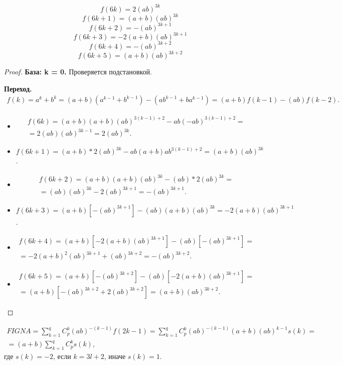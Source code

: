 {\theorem 
$$ f(6k)    = 2(ab)^{3k}        $$
$$ f(6k+1)  = (a+b)(ab)^{3k}    $$
$$ f(6k+2)  = -(ab)^{3k+1}      $$
$$ f(6k+3)  = -2(a+b)(ab)^{3k+1}$$
$$ f(6k+4)  = -(ab)^{3k+2}      $$
$$ f(6k+5)  = (a+b)(ab)^{3k+2}  $$
}
\begin{proof}

{\bfseries База: k = 0.}
Проверяется подстановкой.

{\bfseries Переход. }
\begin{multline*}
    f(k) = a^k + b^k = (a+b)(a^{k-1} + b^{k-1}) - (ab^{k-1} + ba^{k-1}) = (a+b)f(k-1) - (ab)f(k-2).
\end{multline*}
\begin{itemize}
    \item 
        \begin{multline*}
            f(6k) = (a+b)(a+b)(ab)^{3(k-1)+2} - ab(-ab)^{3(k-1)+2} = \\
            = 2(ab)(ab)^{3k-1} = 2(ab)^{3k}.
        \end{multline*}
    \item $f(6k+1) = (a+b) * 2(ab)^{3k} - ab(a+b)ab^{3(k-1)+2} = (a+b)(ab)^{3k}$.
    \item 
        \begin{multline*}
            f(6k+2) = (a+b)(a+b)(ab)^{3k} - (ab)*2(ab)^{3k} = \\
            = (ab)(ab)^{3k} - 2(ab)^{3k+1} = -(ab)^{3k+1}.
        \end{multline*}
    \item $f(6k+3) = (a+b)[-(ab)^{3k+1}] - (ab)(a+b)(ab)^{3k} = -2(a+b)(ab)^{3k+1}$.
    \item 
        \begin{multline*}
            f(6k+4) = (a+b)[-2(a+b)(ab)^{3k+1}] - (ab)[-(ab)^{3k+1}] = \\
            = -2(a+b)^2(ab)^{3k+1} + (ab)^{3k+2} = -(ab)^{3k+2}.
        \end{multline*}
    \item 
        \begin{multline*}
            f(6k+5) = (a+b)[-(ab)^{3k+2}] - (ab)[-2(a+b)(ab)^{3k+1}] = \\
            = (a+b)[-(ab)^{3k+2} + 2(ab)^{3k+2}] = (a+b)(ab)^{3k+2}.
        \end{multline*}        
\end{itemize}
\end{proof}

\begin{multline*}
    FIGNA = \sum_{k=1}^q{C_p^k (ab)^{-(k-1)} f(2k-1)} = \sum_{k=1}^q{C_p^k (ab)^{-(k-1)} (a+b)(ab)^{k-1}s(k)} = \\
    = (a+b) \sum_{k=1}^q{C_p^k}s(k),
\end{multline*}
где $s(k) = -2$, если $k = 3l+2$, иначе $s(k) = 1$.

